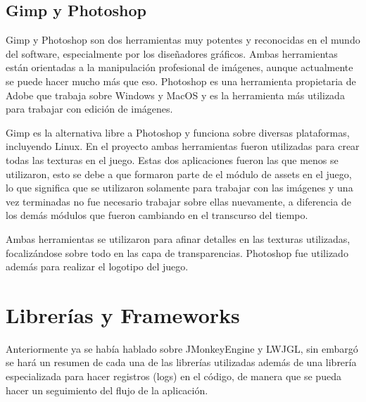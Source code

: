 \documentclass[a4paper,12pt,openany,oneside]{book}
\begin{document}
\subsection{Gimp y Photoshop}
Gimp y Photoshop son dos herramientas muy potentes y reconocidas en el mundo del software, especialmente por los diseñadores gráficos. Ambas herramientas están orientadas a la manipulación profesional de imágenes, aunque actualmente se puede hacer mucho más que eso. Photoshop es una herramienta propietaria de Adobe que trabaja sobre Windows y MacOS y es la herramienta más utilizada para trabajar con edición de imágenes.

Gimp es la alternativa libre a Photoshop y funciona sobre diversas plataformas, incluyendo Linux. En el proyecto ambas herramientas fueron utilizadas para crear todas las texturas en el juego. Estas dos aplicaciones fueron las que menos se utilizaron, esto se debe a que formaron parte de el módulo de assets en el juego, lo que significa que se utilizaron solamente para trabajar con las imágenes y una vez terminadas no fue necesario trabajar sobre ellas nuevamente, a diferencia de los demás módulos que fueron cambiando en el transcurso del tiempo.

Ambas herramientas se utilizaron para afinar detalles en las texturas utilizadas, focalizándose sobre todo en las capa de transparencias.
Photoshop fue utilizado además para realizar el logotipo del juego.
\section{Librerías y Frameworks}
Anteriormente ya se había hablado sobre JMonkeyEngine y LWJGL, sin embargó se hará un resumen de cada una de las librerías utilizadas además de una librería especializada para hacer registros (logs) en el código, de manera que se pueda hacer un seguimiento del flujo de la aplicación.
\end{document}
